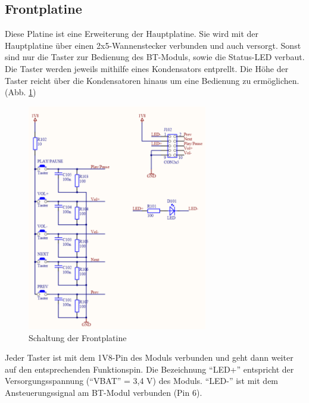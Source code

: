 \subsection*{Frontplatine} \label{subsec:4.1.9}
Diese Platine ist eine Erweiterung der Hauptplatine.
Sie wird mit der Hauptplatine über einen 2x5-Wannenstecker verbunden und auch versorgt.
Sonst sind nur die Taster zur Bedienung des BT-Moduls, sowie die Status-LED verbaut.
\\

Die Taster werden jeweils mithilfe eines Kondensators entprellt.
Die Höhe der Taster reicht über die Kondensatoren hinaus um eine Bedienung zu ermöglichen. (Abb. \ref{fig:4.1.9.2.1})
\begin{figure} [H]
	\centering
	\includegraphics[width=0.7\textwidth]{img/BTModul/front_sch.png}
	\caption{Schaltung der Frontplatine}\label {fig:4.1.9.2.1}
\end{figure}
Jeder Taster ist mit dem 1V8-Pin des Moduls verbunden und geht dann weiter auf den entsprechenden Funktionspin.
Die Bezeichnung \enquote{LED+} entspricht der Versorgungsspannung (\enquote{VBAT} = 3,4 V) des Moduls.
\enquote{LED-} ist mit dem Ansteuerungssignal am BT-Modul verbunden (Pin 6).

